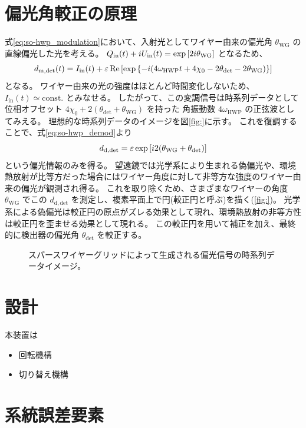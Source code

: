 \documentclass[../../main.tex]{subfiles}
\begin{document}
\section{偏光角較正の原理}
式\eqref{eq:so-hwp_modulation}において、入射光としてワイヤー由来の偏光角 $\theta_{\mathrm{WG}}$ の直線偏光した光を考える。
$Q_{\mathrm{in}}(t) + iU_{\mathrm{in}}(t) = \exp\qty[2i\theta_{\mathrm{WG}}]$ となるため、
\begin{equation}
    d_{\mathrm{m}, \mathrm{det}}(t) = I_{\mathrm{in}}(t) + \varepsilon\Re\qty[\exp\qty{-i \qty(4\omega_{\mathrm{HWP}}t + 4\chi_0 - 2\theta_{\mathrm{det}} - 2\theta_{\mathrm{WG}})}]
\end{equation}
となる。
ワイヤー由来の光の強度はほとんど時間変化しないため、$I_{\mathrm{in}}(t) \simeq \mathrm{const.}$ とみなせる。
したがって、この変調信号は時系列データとして位相オフセット $4\chi_0 + 2(\theta_{\mathrm{det}} + \theta_{\mathrm{WG}})$ を持った
角振動数 $4\omega_{\mathrm{HWP}}$ の正弦波としてみえる。
理想的な時系列データのイメージを図\ref{fig:}に示す。
これを復調することで、式\eqref{eq:so-hwp_demod}より
\begin{equation}
    d_{\mathrm{d, det}} = \varepsilon\exp\qty[i2\qty(\theta_{\mathrm{WG}} + \theta_{\mathrm{det}})]
\end{equation}
という偏光情報のみを得る。
望遠鏡では光学系により生まれる偽偏光や、環境熱放射が比等方だった場合にはワイヤー角度に対して非等方な強度のワイヤー由来の偏光が観測され得る。
これを取り除くため、さまざまなワイヤーの角度 $\theta_{\mathrm{WG}}$ でこの $d_{\mathrm{d, det}}$ を測定し、複素平面上で円(較正円と呼ぶ)を描く(\ref{fig:})。
光学系による偽偏光は較正円の原点がズレる効果として現れ、環境熱放射の非等方性は較正円を歪ませる効果として現れる。
この較正円を用いて補正を加え、最終的に検出器の偏光角 $\theta_{\mathrm{det}}$ を較正する。
\begin{figure}
    \centering
    \caption[スパースワイヤーグリッドによって生成される偏光信号の時系列データイメージ]{スパースワイヤーグリッドによって生成される偏光信号の時系列データイメージ。}
\end{figure}
\section{設計}
本装置は
\begin{itemize}
    \item 回転機構
    \item 切り替え機構
\end{itemize}
\section{系統誤差要素}
\end{document}
